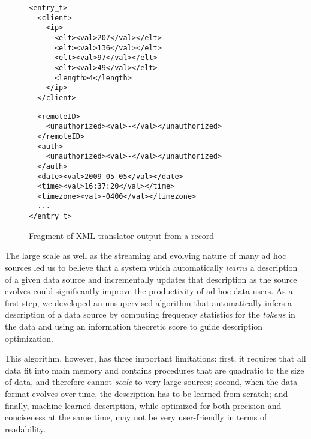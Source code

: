 \begin{figure}[th]
\begin{minipage}[t]{0.45\columnwidth}
{\scriptsize
\begin{verbatim}
<entry_t>
  <client>
    <ip>
      <elt><val>207</val></elt>
      <elt><val>136</val></elt>
      <elt><val>97</val></elt>
      <elt><val>49</val></elt>
      <length>4</length>
    </ip>
  </client>
\end{verbatim}
}
\end{minipage}
\hfill
\begin{minipage}[t]{0.5\columnwidth}
{\scriptsize
\begin{verbatim}
  <remoteID>
    <unauthorized><val>-</val></unauthorized>
  </remoteID>
  <auth>
    <unauthorized><val>-</val></unauthorized>
  </auth>
  <date><val>2009-05-05</val></date>
  <time><val>16:37:20</val></time>
  <timezone><val>-0400</val></timezone>
  ...
</entry_t>
\end{verbatim}
}
\end{minipage}
\caption{Fragment of XML translator output from a \ai{} record}\label{fig:xml}
\shrink
\end{figure}


The large scale as well as the streaming and evolving nature of many ad hoc
sources led us to believe that a system which automatically {\em learns}
a \pads{} description of a given data source and incrementally updates that
description as the source evolves could significantly improve the productivity of ad hoc data users.
As a first step, we developed an unsupervised algorithm \learnpads{}
\cite{Fisher+:dirttoshovels,fisher+:sigmod08}
that automatically infers a \pads{} description of a data source by 
computing frequency statistics for the {\em tokens} in the data and using an information
theoretic score to guide description optimization. 

This algorithm, however, has three important limitations:
first, it requires that all data fit into main memory and contains procedures 
that are quadratic to the size of data, 
and therefore cannot {\em scale} to very large sources; 
second, when the data format evolves over time, 
the description has to be learned from scratch; 
and finally, machine learned description, 
while optimized for both precision and conciseness at the same time, 
may not be very user-friendly in terms of readability.  


